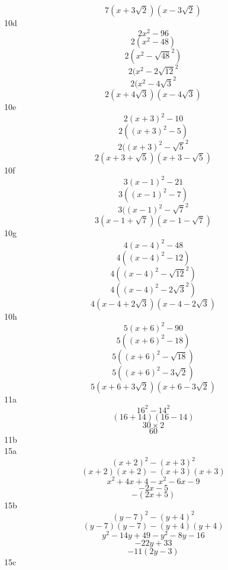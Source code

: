 \documentclass{article}
\begin{document}
\begin{multicols*}{3}
\[7(x + 3\sqrt{2})(x - 3\sqrt{2})\]
10d
\[2x^2 - 96\]
\[2(x^2 - 48)\]
\[2(x^2 - \sqrt{48}^2)\]
\[2(x^2 - 2\sqrt{12}^2\]
\[2(x^2 - 4\sqrt{3}^2\]
\[2(x + 4\sqrt{3})(x - 4\sqrt{3})\]
10e
\[2(x + 3)^2 - 10\]
\[2((x + 3)^2 - 5)\]
\[2((x + 3)^2 - \sqrt{5}^2\]
\[2(x + 3 + \sqrt{5})(x + 3 - \sqrt{5})\]
10f
\[3(x - 1)^2 - 21\]
\[3((x - 1)^2 - 7)\]
\[3((x - 1)^2 - \sqrt{7}^2\]
\[3(x - 1 + \sqrt{7})(x - 1 - \sqrt{7})\]
10g
\[4(x - 4)^2 - 48\]
\[4((x - 4)^2 - 12)\]
\[4((x - 4)^2 - \sqrt{12}^2)\]
\[4((x - 4)^2 - 2\sqrt{3}^2)\]
\[4(x - 4 + 2\sqrt{3})(x - 4 - 2\sqrt{3})\]
10h
\[5(x + 6)^2 - 90\]
\[5((x + 6)^2 - 18)\]
\[5((x + 6)^2 - \sqrt{18})\]
\[5((x + 6)^2 - 3\sqrt{2})\]
\[5(x + 6 + 3\sqrt{2})(x + 6 - 3\sqrt{2})\]
11a
\[16^2 - 14^2\]
\[(16 + 14)(16 - 14)\]
\[30 \times 2\]
\[60\]
11b
\[\]
15a
\[(x + 2)^2 - (x + 3)^2\]
\[(x + 2)(x + 2) - (x + 3)(x + 3)\]
\[x^2 + 4x + 4 - x^2 - 6x - 9\]
\[-2x - 5\]
\[-(2x + 5)\]
15b
\[(y - 7)^2 - (y + 4)^2\]
\[(y - 7)(y - 7) - (y + 4)(y + 4)\]
\[y^2 - 14y + 49 - y^2 - 8y - 16\]
\[-22y + 33\]
\[-11(2y - 3)\]
15c
\end{multicols*}
\end{document}
